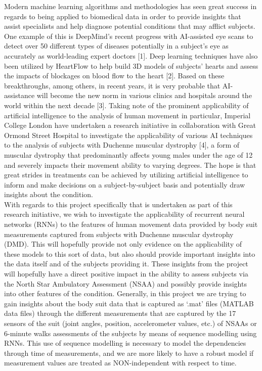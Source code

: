 \documentclass[12pt,twoside]{report}
\begin{document}
\quad Modern machine learning algorithms and methodologies has seen great success in regards to being applied to biomedical data in order to provide insights that assist specialists and help diagnose potential conditions that may afflict subjects. One example of this is DeepMind’s recent progress with AI-assisted eye scans to detect over 50 different types of diseases potentially in a subject’s eye as accurately as world-leading expert doctors [1]. Deep learning techniques have also been utilized by HeartFlow to help build 3D models of subjects’ hearts and assess the impacts of blockages on blood flow to the heart [2]. Based on these breakthroughs, among others, in recent years, it is very probable that AI-assistance will become the new norm in various clinics and hospitals around the world within the next decade [3]. Taking note of the prominent applicability of artificial intelligence to the analysis of human movement in particular, Imperial College London have undertaken a research initiative in collaboration with Great Ormond Street Hospital to investigate the applicability of various AI techniques to the analysis of subjects with Duchenne muscular dystrophy [4], a form of muscular dystrophy that predominantly affects young males under the age of 12 and severely impacts their movement ability to varying degrees. The hope is that great strides in treatments can be achieved by utilizing artificial intelligence to inform and make decisions on a subject-by-subject basis and potentially draw insights about the condition. \\

\quad With regards to this project specifically that is undertaken as part of this research initiative, we wish to investigate the applicability of recurrent neural networks (RNNs) to the features of human movement data provided by body suit measurements captured from subjects with Duchenne muscular dystrophy (DMD). This will hopefully provide not only evidence on the applicability of these models to this sort of data, but also should provide important insights into the data itself and of the subjects providing it. These insights from the project will hopefully have a direct positive impact in the ability to assess subjects via the North Star Ambulatory Assessment (NSAA) and possibly provide insights into other features of the condition. Generally, in this project we are trying to gain insights about the body suit data that is captured as ‘.mat’ files (MATLAB data files) through the different measurements that are captured by the 17 sensors of the suit (joint angles, position, accelerometer values, etc.) of NSAAs or 6-minute walks assessments of the subjects by means of sequence modelling using RNNs. This use of sequence modelling is necessary to model the dependencies through time of measurements, and we are more likely to have a robust model if measurement values are treated as NON-independent with respect to time.\\
\end{document}
